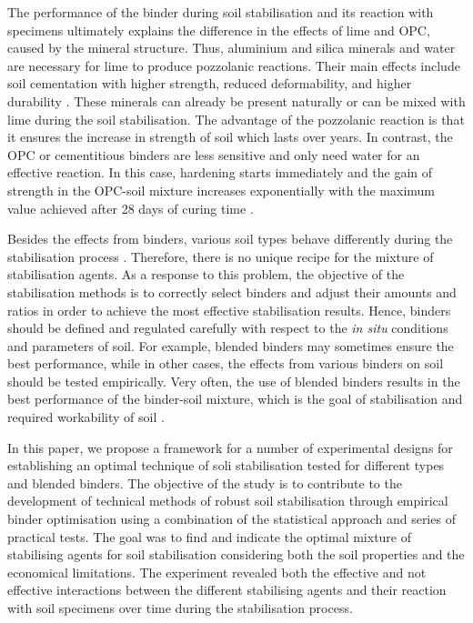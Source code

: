 \documentclass[eprint,
]{actapoly}
\begin{document}
The performance of the binder during soil stabilisation and its reaction with specimens ultimately explains the difference in the effects of lime and OPC, caused by the mineral structure. Thus, aluminium and silica minerals and water are necessary for lime to produce pozzolanic reactions. Their main effects include soil cementation with higher strength, reduced deformability, and higher durability \citep{DISANTE2022100742,AkulaLittle,1988240,VITALE201736}. These minerals can already be present naturally or can be mixed with lime during the soil stabilisation. The advantage of the pozzolanic reaction is that it ensures the increase in strength of soil which lasts over years. In contrast, the OPC or cementitious binders are less sensitive and only need water for an effective reaction. In this case, hardening starts immediately and the gain of strength in the OPC-soil mixture increases exponentially with the maximum value achieved after 28 days of curing time \citep{Bell1995,Makusa}. 

Besides the effects from binders, various soil types behave differently during the stabilisation process \citep{BhattacharjaBhatty,Burroughs2008,Renjithetal2020,VENDAOLIVEIRA2018336,Wall}. Therefore, there is no unique recipe for the mixture of stabilisation agents. As a response to this problem, the objective of the stabilisation methods is to correctly select binders and adjust their amounts and ratios in order to achieve the most effective stabilisation results. Hence, binders should be defined and regulated carefully with respect to the \emph{in situ} conditions and parameters of soil. For example, blended binders may sometimes ensure the best performance, while in other cases, the effects from various binders on soil should be tested empirically. Very often, the use of blended binders results in the best performance of the binder-soil mixture, which is the goal of stabilisation and required workability of soil \citep{Schanz,Kangetal2019}. 

In this paper, we propose a framework for a number of experimental designs for establishing an optimal technique of soli stabilisation tested for different types and blended binders. The objective of the study is to contribute to the development of technical methods of robust soil stabilisation through empirical binder optimisation using a combination of the statistical approach and series of practical tests. The goal was to find and indicate the optimal mixture of stabilising agents for soil stabilisation considering both the soil properties and the economical limitations. The experiment revealed both the effective and not effective interactions between the different stabilising agents and their reaction with soil specimens over time during the stabilisation process. 
\end{document}
